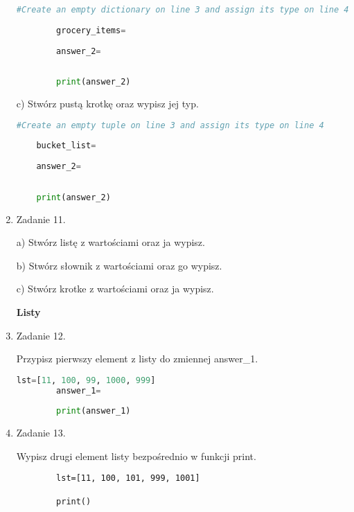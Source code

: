 \documentclass[11pt]{article}
\begin{document}
\begin{enumerate}
	\begin{lstlisting}[language=Python]
		#Create an empty dictionary on line 3 and assign its type on line 4
		
		grocery_items=
		
		answer_2=
		
		
		print(answer_2)
	\end{lstlisting}
\par
c) Stwórz pustą krotkę oraz wypisz jej typ.

\begin{lstlisting}[language=Python]
	#Create an empty tuple on line 3 and assign its type on line 4
	
	bucket_list=
	
	answer_2=
	
	
	print(answer_2)
\end{lstlisting}

	\item 
	\begin{Large}
		Zadanie 11.
	\end{Large}
	\par
	a) Stwórz listę z wartościami oraz ja wypisz.
	\par
	b) Stwórz słownik z wartościami oraz go wypisz.
	\par
	c) Stwórz krotke z wartościami oraz ja wypisz.
	
	\medskip
	\begin{Large}
		\textbf{Listy}
	\end{Large}
	\item 
	\begin{Large}
		Zadanie 12.
	\end{Large}
	\par
	Przypisz pierwszy element z listy do zmiennej answer\_1.
	\begin{lstlisting}[language=Python]
		lst=[11, 100, 99, 1000, 999]
		answer_1=
		
		print(answer_1)
	\end{lstlisting}
	
	\item 
	\begin{Large}
		Zadanie 13.
	\end{Large}
	\par
	Wypisz drugi element listy bezpośrednio w funkcji print.
	\begin{lstlisting}
		lst=[11, 100, 101, 999, 1001]
		
		print()
		
	\end{lstlisting}
	

\end{enumerate}
\end{document}

